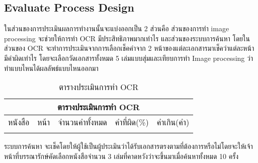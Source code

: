 \subsection{Evaluate Process Design}

ในส่วนของการประเมินผลการทำงานนั้นจะแบ่งออกเป็น 2 ส่วนคือ ส่วนของการทำ image processing จะช่วยให้การทำ OCR มีประสิทธิภาพมากเท่าไร และส่วนของระบบการค้นหา โดยในส่วนของ OCR จะทำการประเมินจากการเลือกเช็คคำจาก 2 หน้าของแต่ละเอกสารมาเช็คว่าแต่ละหน้ามีคำผิดเท่าไร โดยจะเลือกวัดเอกสารทั้งหมด 5 เล่มแบบสุ่มและเทียบการทำ Image processing ว่าทำแบบไหนได้ผลลัพธ์แบบไหนออกมา

\begin{table}[H]
\caption{ตารางประเมินการทำ OCR}\label{tbl:ocr}
\begin{tabular}{|c|c|c|c|c|}
\hline
\multicolumn{5}{|c|}{ตารางประเมินการทำ OCR}                 \\ \hline
หนังสือ & หน้า & จำนวนคำทั้งหมด & คำที่ผิด(\%) & คำเกิน(คำ) \\ \hline
        &      &                &              &            \\ \hline
\end{tabular}
\end{table}

ระบบการค้นหา จะเช็คโดยให้ผู้ใช้เป็นผู้ประเมินว่าได้รับเอกสารตรงตามที่ต้องการหรือไม่โดยจะให้เจ้าหน้าที่บรรณารักษ์คัดเลือกหนังสือจำนวน 3 เล่มที่คาดหวังว่าจะขึ้นมาเมื่อค้นหาทั้งหมด 10 ครั้ง

